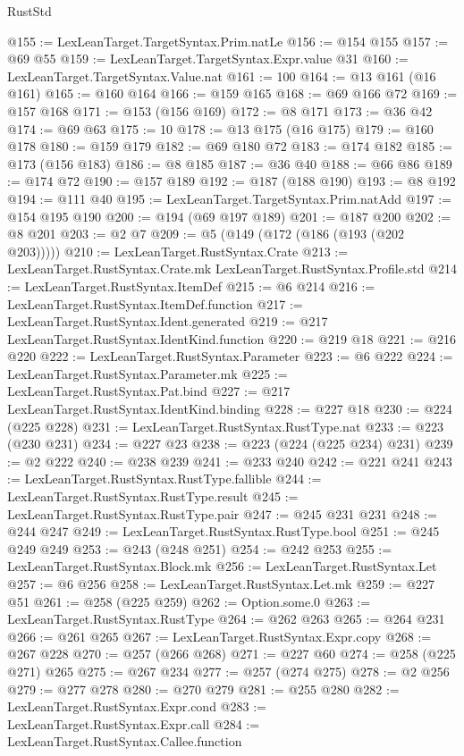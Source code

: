 \begin{lexlean}{RustStd}
\begin{coremodule}
@155 := LexLeanTarget.TargetSyntax.Prim.natLe
@156 := @154 @155
@157 := @69 @55
@159 := LexLeanTarget.TargetSyntax.Expr.value @31
@160 := LexLeanTarget.TargetSyntax.Value.nat
@161 := 100
@164 := @13 @161 (@16 @161)
@165 := @160 @164
@166 := @159 @165
@168 := @69 @166 @72
@169 := @157 @168
@171 := @153 (@156 @169)
@172 := @8 @171
@173 := @36 @42
@174 := @69 @63
@175 := 10
@178 := @13 @175 (@16 @175)
@179 := @160 @178
@180 := @159 @179
@182 := @69 @180 @72
@183 := @174 @182
@185 := @173 (@156 @183)
@186 := @8 @185
@187 := @36 @40
@188 := @66 @86
@189 := @174 @72
@190 := @157 @189
@192 := @187 (@188 @190)
@193 := @8 @192
@194 := @111 @40
@195 := LexLeanTarget.TargetSyntax.Prim.natAdd
@197 := @154 @195 @190
@200 := @194 (@69 @197 @189)
@201 := @187 @200
@202 := @8 @201
@203 := @2 @7
@209 := @5 (@149 (@172 (@186 (@193 (@202 @203)))))
@210 := LexLeanTarget.RustSyntax.Crate
@213 := LexLeanTarget.RustSyntax.Crate.mk LexLeanTarget.RustSyntax.Profile.std
@214 := LexLeanTarget.RustSyntax.ItemDef
@215 := @6 @214
@216 := LexLeanTarget.RustSyntax.ItemDef.function
@217 := LexLeanTarget.RustSyntax.Ident.generated
@219 := @217 LexLeanTarget.RustSyntax.IdentKind.function
@220 := @219 @18
@221 := @216 @220
@222 := LexLeanTarget.RustSyntax.Parameter
@223 := @6 @222
@224 := LexLeanTarget.RustSyntax.Parameter.mk
@225 := LexLeanTarget.RustSyntax.Pat.bind
@227 := @217 LexLeanTarget.RustSyntax.IdentKind.binding
@228 := @227 @18
@230 := @224 (@225 @228)
@231 := LexLeanTarget.RustSyntax.RustType.nat
@233 := @223 (@230 @231)
@234 := @227 @23
@238 := @223 (@224 (@225 @234) @231)
@239 := @2 @222
@240 := @238 @239
@241 := @233 @240
@242 := @221 @241
@243 := LexLeanTarget.RustSyntax.RustType.fallible
@244 := LexLeanTarget.RustSyntax.RustType.result
@245 := LexLeanTarget.RustSyntax.RustType.pair
@247 := @245 @231 @231
@248 := @244 @247
@249 := LexLeanTarget.RustSyntax.RustType.bool
@251 := @245 @249 @249
@253 := @243 (@248 @251)
@254 := @242 @253
@255 := LexLeanTarget.RustSyntax.Block.mk
@256 := LexLeanTarget.RustSyntax.Let
@257 := @6 @256
@258 := LexLeanTarget.RustSyntax.Let.mk
@259 := @227 @51
@261 := @258 (@225 @259)
@262 := Option.some.{0}
@263 := LexLeanTarget.RustSyntax.RustType
@264 := @262 @263
@265 := @264 @231
@266 := @261 @265
@267 := LexLeanTarget.RustSyntax.Expr.copy
@268 := @267 @228
@270 := @257 (@266 @268)
@271 := @227 @60
@274 := @258 (@225 @271) @265
@275 := @267 @234
@277 := @257 (@274 @275)
@278 := @2 @256
@279 := @277 @278
@280 := @270 @279
@281 := @255 @280
@282 := LexLeanTarget.RustSyntax.Expr.cond
@283 := LexLeanTarget.RustSyntax.Expr.call
@284 := LexLeanTarget.RustSyntax.Callee.function

\end{coremodule}
\end{lexlean}
